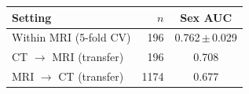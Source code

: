 \begin{tabular}{lrc}
\toprule
Setting & $n$ & Sex AUC \\
\midrule
Within MRI (5-fold CV) & 196 & 0.762\,$\pm$\,0.029 \\
CT $\rightarrow$ MRI (transfer) & 196 & 0.708 \\
MRI $\rightarrow$ CT (transfer) & 1174 & 0.677 \\
\bottomrule
\end{tabular}
